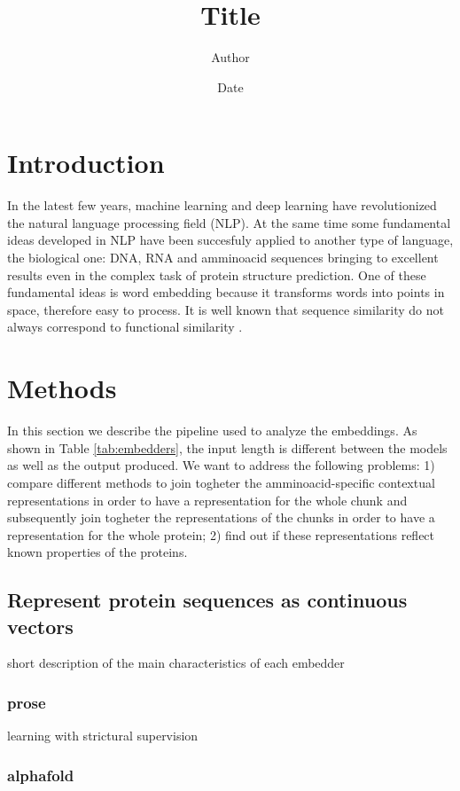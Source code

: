 \documentclass[12pt, letterpaper, twocolumn]{article}
\title{Title}
\author{Author}
\date{Date}
\begin{document}
\maketitle


\section{Introduction}
In the latest few years, machine learning and deep learning have revolutionized the natural language processing field (NLP)\cite{khurana2023natural}. At the same time some fundamental ideas developed in NLP have been succesfuly applied to another type of language, the biological one: DNA, RNA and amminoacid sequences bringing to excellent results even in the complex task of protein structure prediction\cite{jumper2021highly, lin2022language}. One of these fundamental ideas is word embedding \cite{mikolov2013efficient} because it transforms words into points in space, therefore easy to process.
It is well known that sequence similarity do not always correspond to functional similarity \cite{kosloff2008sequence}.

\section{Methods}

In this section we describe the pipeline used to analyze the embeddings. As shown in Table \ref{tab:embedders}, the input length is different between the models as well as the output produced. We want to address the following problems: 1) compare different methods to join togheter the amminoacid-specific contextual representations in order to have a representation for the whole chunk and subsequently join togheter the representations of the chunks in order to have a representation for the whole protein; 2) find out if these representations reflect known properties of the proteins.

\subsection{Represent protein sequences as continuous vectors}
short description of the main characteristics of each embedder

\subsubsection{prose}
learning with strictural supervision

\subsubsection{alphafold}
\end{document}

